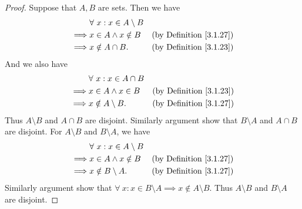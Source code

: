 \begin{proof}
    Suppose that \(A, B\) are sets.
    Then we have
    \begin{align*}
                 & \forall\ x : x \in A \setminus B                                       \\
        \implies & x \in A \land x \notin B         & \text{(by Definition \ref{3.1.27})} \\
        \implies & x \notin A \cap B.               & \text{(by Definition \ref{3.1.23})}
    \end{align*}
    And we also have
    \begin{align*}
                 & \forall\ x : x \in A \cap B                                       \\
        \implies & x \in A \land x \in B       & \text{(by Definition \ref{3.1.23})} \\
        \implies & x \notin A \setminus B.     & \text{(by Definition \ref{3.1.27})}
    \end{align*}
    Thus \(A \setminus B\) and \(A \cap B\) are disjoint.
    Similarly argument show that \(B \setminus A\) and \(A \cap B\) are disjoint.
    For \(A \setminus B\) and \(B \setminus A\), we have
    \begin{align*}
                 & \forall\ x : x \in A \setminus B                                       \\
        \implies & x \in A \land x \notin B         & \text{(by Definition \ref{3.1.27})} \\
        \implies & x \notin B \setminus A.          & \text{(by Definition \ref{3.1.27})}
    \end{align*}
    Similarly argument show that \(\forall\ x : x \in B \setminus A \implies x \notin A \setminus B\).
    Thus \(A \setminus B\) and \(B \setminus A\) are disjoint.


\end{proof}
